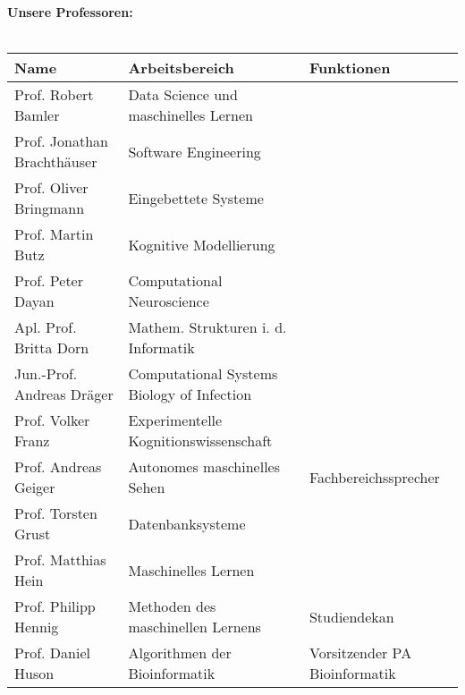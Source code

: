 \renewcommand{\arraystretch}{1}
\scriptsize
\textbf{Unsere Professoren:}\\\\
\begin{tabular}{|lll|}
	\hline
	Name                             & Arbeitsbereich                                        & Funktionen                               \\
	\hline
	\hline
	Prof. Robert Bamler              & Data Science und maschinelles Lernen                  &                                          \\
	Prof. Jonathan Brachthäuser      & Software Engineering                                  &                                          \\
	Prof. Oliver Bringmann           & Eingebettete Systeme                                  &                                          \\
	Prof. Martin Butz                & Kognitive Modellierung                                &                                          \\
	Prof. Peter Dayan                & Computational Neuroscience                            &                                          \\
	Apl. Prof. Britta Dorn           & Mathem. Strukturen i. d. Informatik                   &                                          \\
	Jun.-Prof. Andreas Dräger        & Computational Systems Biology of Infection            &                                          \\
	Prof. Volker Franz               & Experimentelle Kognitionswissenschaft                 &                                          \\
	Prof. Andreas Geiger             & Autonomes maschinelles Sehen                          & Fachbereichssprecher                     \\
	Prof. Torsten Grust              & Datenbanksysteme                                      &                                          \\
	Prof. Matthias Hein              & Maschinelles Lernen                                   &                                          \\
	Prof. Philipp Hennig             & Methoden des maschinellen Lernens                     & Studiendekan                             \\
	Prof. Daniel Huson               & Algorithmen der Bioinformatik                         & Vorsitzender PA Bioinformatik            \\

\end{tabular}
